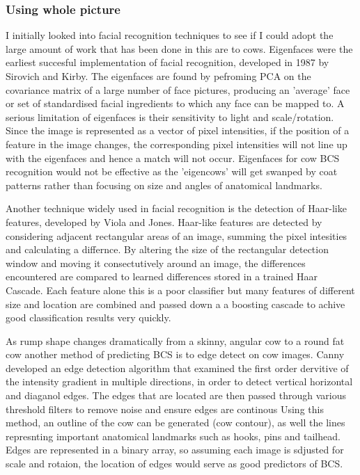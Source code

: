 \documentclass[11pt]{article}
\begin{document}
	\subsubsection{Using whole picture}
	I initially looked into facial recognition techniques to see if I could adopt the large amount of work that has been done in this are to cows.
	Eigenfaces were the earliest succesful implementation of facial recognition, developed in 1987 by Sirovich and Kirby.
	The eigenfaces are found by pefroming PCA on the covariance matrix of a large number of face pictures, producing an 'average' face or set of standardised facial ingredients to which any face can be mapped to.
	A serious limitation of eigenfaces is their sensitivity to light and scale/rotation. 
	Since the image is represented as a vector of pixel intensities, if the position of a feature in the image changes, the corresponding pixel intensities will not line up with the eigenfaces and hence a match will not occur.
	Eigenfaces for cow BCS recognition would not be effective as the 'eigencows' will get swanped by coat patterns rather than focusing on size and angles of anatomical landmarks.



	Another technique widely used in facial recognition is the detection of Haar-like features, developed by Viola and Jones\cite{viola2004}.
	Haar-like features are detected by considering adjacent rectangular areas of an image, summing the pixel intesities and calculating a differnce. 
	By altering the size of the rectangular detection window and moving it consectutively around an image, the differences encountered are compared to learned differences stored in a trained Haar Cascade.
	Each feature alone this is a poor classifier but many features of different size and location are combined and passed down a a boosting cascade to achive good classification results very quickly.
	

	As rump shape changes dramatically from a skinny, angular cow to a round fat cow another method of predicting BCS is to edge detect on cow images.
	Canny developed an edge detection algorithm that examined the first order dervitive of the intensity gradient in multiple directions, in order to detect vertical horizontal and diaganol edges\cite{Canny1986}.
	The edges that are located are then passed through various threshold filters to remove noise and ensure edges are continous
	Using this method, an outline of the cow can be generated (cow contour), as well the lines represnting important anatomical landmarks such as hooks, pins and tailhead.
	Edges are represented in a binary array, so assuming each image is sdjusted for scale and rotaion, the location of edges would serve as good predictors of BCS.
\end{document}
